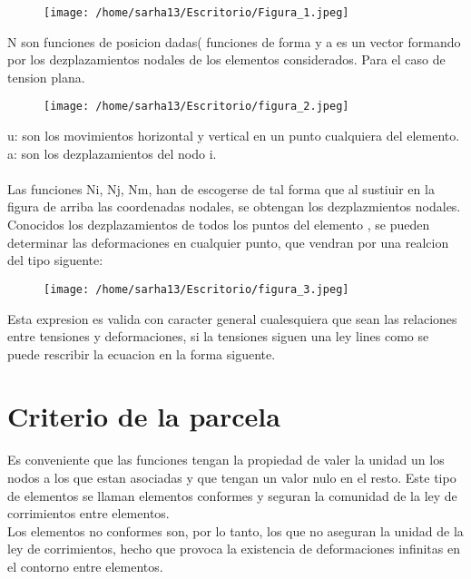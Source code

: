 \documentclass[letter,openright,12pt,spanish]{report}
\begin{document}
\begin{figure}[htp!]
\centering
\texttt{[image: /home/sarha13/Escritorio/Figura\_1.jpeg]}
\caption{}
\label{Figura 2.}
\end{figure}

N son funciones de posicion dadas( funciones de forma y a es un vector formando por los dezplazamientos nodales de los elementos considerados. Para el caso de tension plana.

\begin{figure}[htp!]
\centering
\texttt{[image: /home/sarha13/Escritorio/figura\_2.jpeg]}
\caption{}
\label{Figura 3.}
\end{figure}

u: son los movimientos horizontal y vertical en un punto cualquiera del elemento.\\
a: son los dezplazamientos del nodo i.\\\\

Las funciones Ni, Nj, Nm, han de escogerse de tal forma que al sustiuir en la figura de arriba las coordenadas nodales, se obtengan los dezplazmientos nodales.\\
Conocidos los dezplazamientos de todos los puntos del elemento , se pueden determinar las deformaciones en cualquier punto, que vendran por una realcion del tipo siguente:

\begin{figure}[htp!]
\centering
\texttt{[image: /home/sarha13/Escritorio/figura\_3.jpeg]}
\caption{}
\label{Figura 4.}
\end{figure}

Esta expresion es valida con caracter general cualesquiera que sean las relaciones entre tensiones y deformaciones, si la tensiones siguen una ley lines como se puede rescribir la ecuacion en la forma siguente.
\section{Criterio de la parcela}
Es conveniente que las funciones tengan la propiedad de valer la unidad un los nodos a los que estan asociadas y que tengan un valor nulo en el resto. Este tipo de elementos se llaman elementos conformes y seguran la comunidad de la ley de corrimientos entre elementos.\\
Los elementos no conformes son, por lo tanto, los que no aseguran la unidad de la ley de corrimientos, hecho que provoca la existencia de deformaciones infinitas en el contorno entre elementos.
\end{document}
